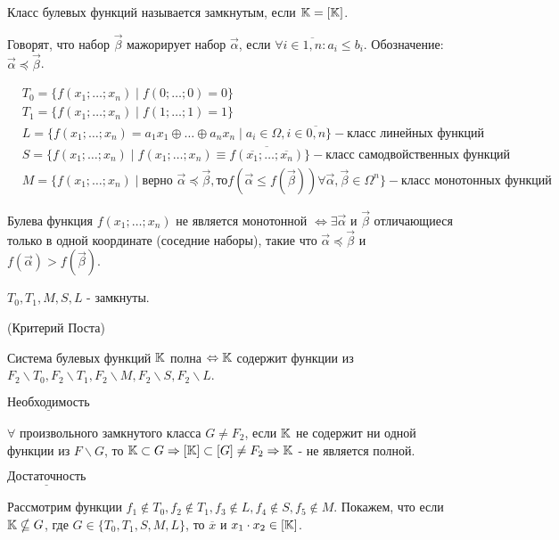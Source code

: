 \opr Класс булевых функций называется замкнутым, если $\mathbb{K} = [\mathbb{K}]$.

Говорят, что набор $\vec{\beta}$ мажорирует набор $\vec{\alpha}$, если $\forall i \in \overline{1, n}: a_i \leq b_i$. Обозначение: $\vec{\alpha} \preccurlyeq \vec{\beta}$.

\examplei
\begin{align*}
    &T_0 = \{f(x_1; \dots; x_n) \mid f(0; \dots; 0) = 0\}\\
    &T_1 = \{f(x_1; \dots; x_n) \mid f(1; \dots; 1) = 1\}\\
    &L   = \{f(x_1; \dots; x_n) = a_1x_1 \oplus \ldots \oplus a_nx_n \mid a_i \in \Omega, i \in \overline{0, n}\} - \text{класс линейных функций}\\
    &S   = \{f(x_1; \dots; x_n) \mid f(x_1; \dots; x_n) \equiv \overline{f(\overline{x_1}; \dots; \overline{x_n})} \} - \text{класс самодвойственных функций} \\
    &M   = \{f(x_1; \dots; x_n) \mid \text{верно } \vec{\alpha} \preccurlyeq \vec{\beta}, \text{то} f(\vec{\alpha} \leq f(\vec{\beta})) \forall \vec{\alpha}, \vec{\beta} \in \Omega^n\} - \text{класс монотонных функций}
\end{align*}

\lem Булева функция $f(x_1; \dots; x_n)$ не является монотонной $\Leftrightarrow \exists \vec{\alpha}$ и $\vec{\beta}$ отличающиеся
только в одной координате (соседние наборы), такие что $\vec{\alpha} \preccurlyeq \vec{\beta}$ и $f(\vec{\alpha}) > f(\vec{\beta})$.

\thr $T_0, T_1, M, S, L$ - замкнуты.

\thr (Критерий Поста)

Система булевых функций $\mathbb{K}$ полна $\Leftrightarrow \mathbb{K}$ содержит функции из $F_2 \backslash T_0, F_2 \backslash T_1, F_2 \backslash M, F_2 \backslash S, F_2 \backslash L$.

\proof 

    $\underline{\text{Необходимость}}$

    $\forall$ произвольного замкнутого класса $G \neq F_2$, если $\mathbb{K}$ не содержит ни одной функции из $F \backslash G$, то $\mathbb{K} \subset G \Rightarrow [\mathbb{K}] \subset [G] \neq F_2 \Rightarrow \mathbb{K}$ - не
является полной.

    $\underline{\text{Достаточность}}$

    Рассмотрим функции $f_1 \notin T_0, f_2 \notin T_1, f_3 \notin L, f_4 \notin S, f_5 \notin M$.
    Покажем, что если $\mathbb{K} \nsubseteq G$, где $G \in \{T_0, T_1, S, M, L\}$, то $\overline{x}$ и $x_1\cdot x_2 \in [\mathbb{K}]$.

